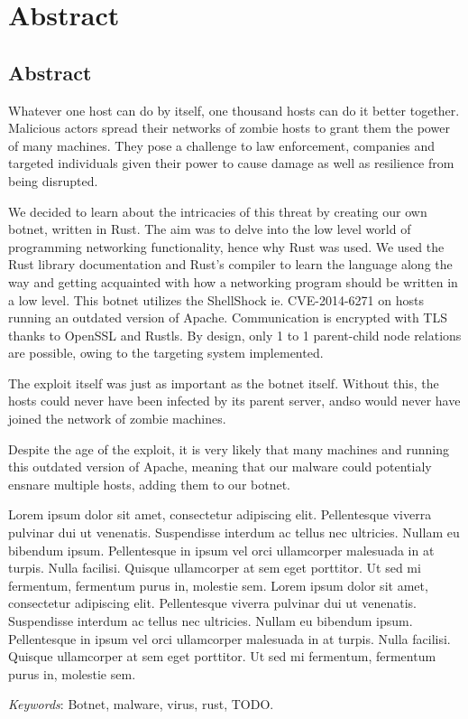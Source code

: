 \documentclass[../main.tex]{subfiles}
\begin{document}
    \newpage

	\chapter*{Abstract}

    \section*{Abstract}

Whatever one host can do by itself, one thousand hosts can do it better together. Malicious actors spread their networks of zombie hosts to grant them the power of many machines.
They pose a challenge to law enforcement, companies and targeted individuals given their power to cause damage as well as resilience from being disrupted.

We decided to learn about the intricacies of this threat by creating our own botnet, written in Rust.
The aim was to delve into the low level world of programming networking functionality, hence why Rust was used. We used the Rust library documentation and Rust's compiler to learn
the language along the way and getting acquainted with how a networking program should be written in a low level.
This botnet utilizes the ShellShock ie. CVE-2014-6271 on hosts running an outdated version of Apache.
Communication is encrypted with TLS thanks to OpenSSL and Rustls. By design, only 1 to 1 parent-child node relations are possible, owing to the targeting system implemented.

The exploit itself was just as important as the botnet itself. Without this, the hosts could never have been infected by its parent server, andso would never have joined the network
of zombie machines.

Despite the age of the exploit, it is very likely that many machines and running this outdated version of Apache, meaning that our malware could potentialy ensnare multiple hosts,
adding them to our botnet.


Lorem ipsum dolor sit amet, consectetur adipiscing elit. Pellentesque viverra pulvinar dui ut venenatis.
Suspendisse interdum ac tellus nec ultricies. Nullam eu bibendum ipsum. Pellentesque in ipsum vel orci 
ullamcorper malesuada in at turpis. Nulla facilisi. Quisque ullamcorper at sem eget porttitor. Ut sed mi fermentum, 
fermentum purus in, molestie sem.
Lorem ipsum dolor sit amet, consectetur adipiscing elit. Pellentesque viverra pulvinar dui ut venenatis.
Suspendisse interdum ac tellus nec ultricies. Nullam eu bibendum ipsum. Pellentesque in ipsum vel orci 
ullamcorper malesuada in at turpis. Nulla facilisi. Quisque ullamcorper at sem eget porttitor. Ut sed mi fermentum, 
fermentum purus in, molestie sem.

	\qquad \textit{Keywords}: Botnet, malware, virus, rust, TODO.


	\vspace{10pt}
\end{document}
